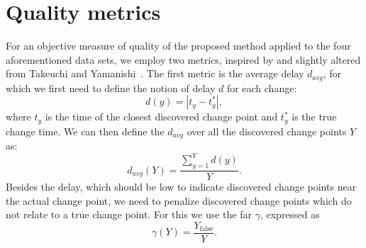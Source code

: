 \section{Quality metrics}\label{sec:artificial_data_quality_metrics}
For an objective measure of quality of the proposed method applied to the four aforementioned data sets, we employ two metrics, inspired by and slightly altered from Takeuchi and Yamanishi~\cite{takeuchi2006unifying}.
The first metric is the average delay $d_{avg}$, for which we first need to define the notion of delay $d$ for each change:
\begin{equation}\label{eq:delay}
  d(y) = |t_y - t_y^*|,
\end{equation}
where $t_y$ is the time of the closest discovered change point and $t_y^*$ is the true change time.
We can then define the $d_{avg}$ over all the discovered change points $Y$ as:
\begin{equation}\label{eq:average_delay}
  d_{avg}(Y) = \frac{\sum_{y=1}^Y d(y)}{Y}.
\end{equation}
Besides the delay, which should be low to indicate discovered change points near the actual change point, we need to penalize discovered change points which do not relate to a true change point.
For this we use the \acrlong{far} $\gamma$, expressed as
\begin{equation}\label{eq:false_alarm_rate}
  \gamma(Y) = \frac{Y_{\operatorname*{false}}}{Y}.
\end{equation}

